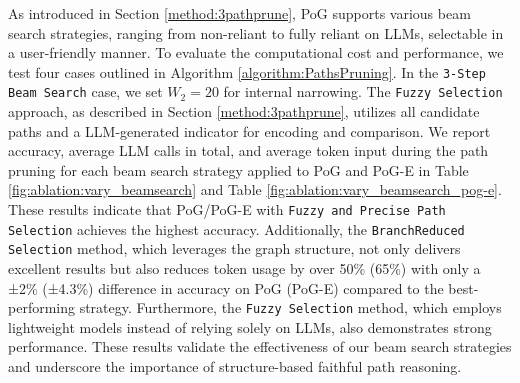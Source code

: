  As introduced in Section \ref{method:3pathprune}, PoG supports various beam search strategies, ranging from non-reliant to fully reliant on LLMs, selectable in a user-friendly manner. To evaluate the computational cost and performance, we test four cases outlined in Algorithm \ref{algorithm:PathsPruning}. In the \texttt{3-Step Beam Search} case, we set $W_2 = 20$ for internal narrowing. The \texttt{Fuzzy Selection} approach, as described in Section \ref{method:3pathprune}, utilizes all candidate paths and a LLM-generated indicator for encoding and comparison.
We report accuracy, average LLM calls in total, and average token input during the path pruning for each beam search strategy applied to PoG and PoG-E in Table \ref{fig:ablation:vary_beamsearch} and Table \ref{fig:ablation:vary_beamsearch_pog-e}.
These results indicate that PoG/PoG-E with \texttt{Fuzzy and Precise Path Selection} achieves the highest accuracy. Additionally, the \texttt{BranchReduced Selection} method, which leverages the graph structure, not only delivers excellent results but also reduces token usage by over 50\% (65\%) with only a ±2\% (±4.3\%) difference in accuracy on PoG (PoG-E) compared to the best-performing strategy. Furthermore, the \texttt{Fuzzy Selection} method, which employs lightweight models instead of relying solely on LLMs, also demonstrates strong performance. These results validate the effectiveness of our beam search strategies and underscore the importance of structure-based faithful path reasoning. 


